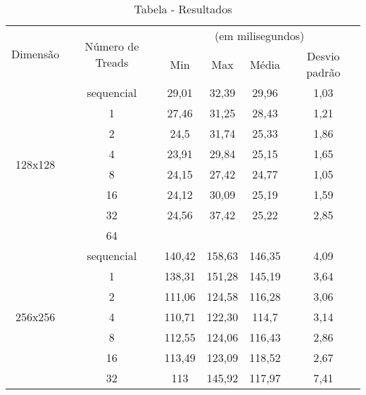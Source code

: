 \newpage
\begin{table}[!h]
	\centering
	\caption{Tabela - Resultados}
	\label{Tabela Resultados}
	\begin{tabular}{|c|c|cccc|}
		\hline
		\multirow{2}{*}{Dimensão} & \multirow{2}{*}{Número de Treads} & \multicolumn{4}{c}{(em milisegundos)} \\
		&                                   & Min  & Max  & Média  & Desvio padrão  \\ \hline\hline
		\multirow{8}{*}{128x128}      & sequencial    &    29,01  & 32,39     & 29,96      & 1,03            \\
		& 1                                 &   27,46   &  31,25    & 28,43       &   1,21             \\
		& 2                                 &   24,5   &   31,74   &  25,33      &  1,86              \\
		& 4                                 &   23,91   &  29,84    &   25,15     & 1,65               \\
		& 8                                 &  24,15    &  27,42    &  24,77      & 1,05               \\
		& 16                                &   24,12   &  30,09    & 25,19       &   1,59             \\
		& 32                                &   24,56   &  37,42    &  25,22      &  2,85              \\
		& 64                                &      &      &        &               \\ \hline
		\multirow{8}{*}{256x256}      & sequencial  &    140,42  &   158,63   & 146,35       &    4,09            \\
		& 1                                 &   138,31   &    151,28  &   145,19     &    3,64            \\
		& 2                                 &    111,06  &  124,58    &    116,28    &   3,06             \\
		& 4                                 &    110,71  &   122,30   &     114,7   &    3,14            \\
		& 8                                 &   112,55   & 124,06     &  116,43      &     2,86           \\
		& 16                                &   113,49   &   123,09   &    118,52    &     2,67           \\
		& 32                                &    113  &    145,92  &  117,97      &     7,41           \\

\end{tabular}
\end{table}
